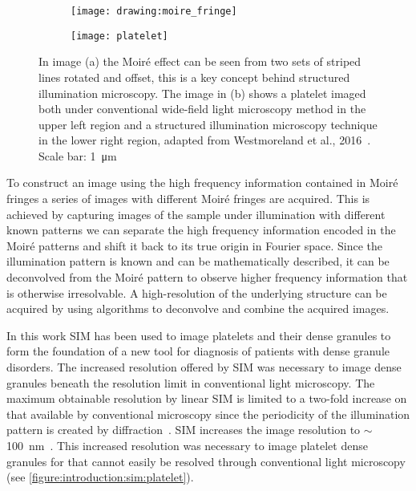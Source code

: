 \begin{figure}[htbp!]\centering
\hspace*{\fill}
	\begin{subfigure}[b]{0.33\linewidth}
		\centering
		\texttt{[image: drawing:moire\_fringe]}
		\caption{}
		\label{figure:introduction:sim:moire}
	\end{subfigure}
	\hfill
	\begin{subfigure}[b]{0.33\linewidth}
		\centering
		\texttt{[image: platelet]}
		\caption{}
		\label{figure:introduction:sim:platelet}
	\end{subfigure}
\hspace*{\fill}
\caption[Structured illumination microscopy]{In image (a) the Moir\'e effect can be seen from two sets of striped lines rotated and offset, this is a key concept behind structured illumination microscopy. The image in (b) shows a platelet imaged both under conventional wide-field light microscopy method in the upper left region and a structured illumination microscopy technique in the lower right region, adapted from Westmoreland et al., 2016~\cite{Westmoreland2016}. Scale bar: \SI{1}{\micro\meter}}
\label{figure:sim}
\end{figure}

To construct an image using the high frequency information contained in Moir\'e fringes a series of images with different Moir\'e fringes are acquired. 
This is achieved by capturing images of the sample under illumination with different known patterns we can separate the high frequency information encoded in the Moir\'e patterns and shift it back to its true origin in Fourier space. Since the illumination pattern is known and can be mathematically described, it can be deconvolved from the Moir\'e pattern to observe higher frequency information that is otherwise irresolvable. A high-resolution of the underlying structure can be acquired by using algorithms to deconvolve and combine the acquired images.

In this work SIM has been used to image platelets and their dense granules to form the foundation of a new tool for diagnosis of patients with dense granule disorders. The increased resolution offered by SIM was necessary to image dense granules beneath the resolution limit in conventional light microscopy. The maximum obtainable resolution by linear SIM is limited to a two-fold increase on that available by conventional microscopy since the periodicity of the illumination pattern is created by diffraction~\cite{Gustafsson2000}. SIM increases the image resolution to $\sim$\SI{100}{\nano\meter}~\cite{Huang2010}. This increased resolution was necessary to image platelet dense granules for that cannot easily be resolved through conventional light microscopy (see \autoref{figure:introduction:sim:platelet}).

